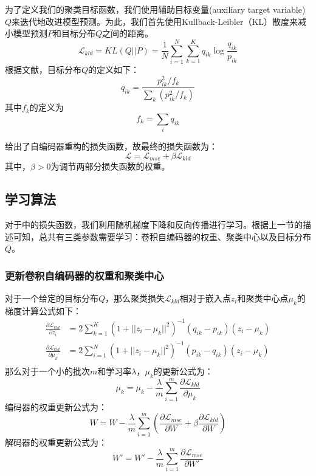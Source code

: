 为了定义我们的聚类目标函数，我们使用辅助目标变量(auxiliary target variable)$Q$来迭代地改进模型预测。为此，我们首先使用Kullback-Leibler（KL）散度来减小模型预测$P$和目标分布$Q$之间的距离。
\begin{equation}
	\mathscr{L}_{kld}=KL(Q||P)=\frac{1}{N}\sum_{i=1}^{N}\sum_{k=1}^{K}q_{ik}\log{\frac{q_{ik}}{p_{ik}}}
	\label{equ:kldfirst}
\end{equation}
根据文献\cite{xie2016unsupervised}，目标分布$Q$的定义如下：
\begin{equation}
	q_{ik}=\frac{p_{ik}^2/f_k}{\sum_k(p_{ik}^2/f_k)}
	\label{equ:traget_distribution}
\end{equation}
其中$f_k$的定义为
\begin{equation}
	f_k=\sum_iq_{ik}
\end{equation}

给出了自编码器重构的损失函数，故最终的损失函数为：
\begin{equation}
	\mathscr{L}=\mathscr{L}_{mse}+\beta \mathscr{L}_{kld}
	\label{equ:l_last}
\end{equation}
其中，$\beta > 0$为调节两部分损失函数的权重。

\subsection{学习算法}
对于中的损失函数，我们利用随机梯度下降和反向传播进行学习。根据上一节的描述可知，总共有三类参数需要学习：卷积自编码器的权重、聚类中心以及目标分布$Q$。
\subsubsection{更新卷积自编码器的权重和聚类中心}
对于一个给定的目标分布$Q$，那么聚类损失$\mathscr{L}_{kld}$相对于嵌入点$z_i$和聚类中心点$\mu_k$的梯度计算公式如下：
\begin{align}
	\frac{\partial \mathscr{L}_{kld}}{\partial z_i} &= 2\sum_{k=1}^K(1+||z_i-\mu_k||^2)^{-1}(q_{ik}-p_{ik})(z_i-\mu_k) \\
	\frac{\partial \mathscr{L}_{kld}}{\partial \mu_k} &= 2\sum_{i=1}^N(1+||z_i-\mu_k||^2)^{-1}(p_{ik}-q_{ik})(z_i-\mu_k) \\
\end{align}
那么对于一个小的批次$m$和学习率$\lambda$，$\mu_k$的更新公式为：
\begin{equation}
	\mu_k=\mu_k-\frac{\lambda}{m}\sum_{i=1}^m{\frac{\partial \mathscr{L}_{kld}}{\partial \mu_k}}
\end{equation}
编码器的权重更新公式为：
\begin{equation}
	W=W-\frac{\lambda}{m}\sum_{i=1}^m(\frac{\partial \mathscr{L}_{mse}}{\partial W} + \beta \frac{\partial \mathscr{L}_{kld}}{\partial W})
	\label{equ:encoder_update}
\end{equation}
解码器的权重更新公式为：
\begin{equation}
	W'=W'-\frac{\lambda}{m}\sum_{i=1}^m{\frac{\partial \mathscr{L}_{mse}}{\partial W'}}
\end{equation}

